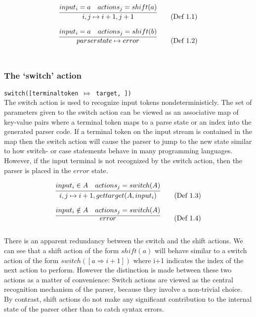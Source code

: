 \documentclass[11pt]{article}
\begin{document}
\begin{equation}
\infer{i, j \mapsto i+1, j+1}{input_i = a & actions_j = shift(a)} \tag{Def 1.1}
\end{equation}

\begin{equation}
\infer{parserstate \mapsto error}{input_i = a & actions_j = shift(b)} \tag{Def 1.2}
\end{equation}\\

\subsubsection{The `switch' action}
\texttt{switch([terminaltoken $\Mapsto$ target, \textellipsis])}\\
The switch action is used to recognize input tokens nondeterministicly.
The set of parameters given to the switch action can be viewed as an associative map of key-value pairs where a terminal token maps to a parse state or an index into the generated parser code.
If a terminal token on the input stream is contained in the map then the switch action will cause the parser to jump to the new state similar to how switch- or case statements behave in many programming languages.
However, if the input terminal is not recognized by the switch action, then the parser is placed in the $error$ state.

\begin{equation}
\infer{i, j \mapsto i+1, gettarget(A, input_i)}{input_i \in A & actions_j = switch(A)} \tag{Def 1.3}
\end{equation}

\begin{equation}
\infer{error}{input_i \notin A & actions_j = switch(A)} \tag{Def 1.4}
\end{equation}\\

There is an apparent redundancy between the switch and the shift actions. 
We can see that a shift action of the form $shift(a)$ will behave similar to a switch action of the form $switch([a \Rightarrow i+1])$ where i+1 indicates the index of the next action to perform.
However the distinction is made between these two actions as a matter of convenience: 
Switch actions are viewed as the central recognition mechanism of the parser, because they involve a non-trivial choice.
By contrast, shift actions do not make any significant contribution to the internal state of the parser other than to catch syntax errors.
\end{document}
